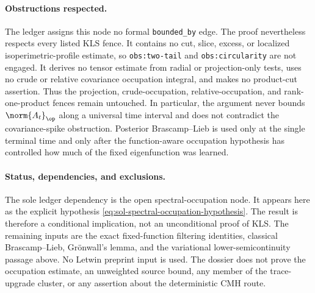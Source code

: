 \documentclass[../main.tex]{subfiles}
\begin{document}
\paragraph{Obstructions respected.}
The ledger assigns this node no formal \texttt{bounded\_by} edge.
The proof nevertheless respects every listed KLS fence.  It contains no cut, slice, excess, or
localized isoperimetric-profile estimate, so \texttt{obs:two-tail} and
\texttt{obs:circularity} are not engaged.  It derives no tensor estimate from radial or
projection-only tests, uses no crude or relative covariance occupation integral, and makes no
product-cut assertion.  Thus the projection, crude-occupation, relative-occupation, and
rank-one-product fences remain untouched.  In
particular, the argument never bounds $\norm{A_t}_\op$ along a universal time interval and does
not contradict the covariance-spike obstruction.  Posterior Brascamp--Lieb is used only at the
single terminal time and only after the function-aware occupation hypothesis has controlled how
much of the fixed eigenfunction was learned.

\paragraph{Status, dependencies, and exclusions.}
The sole ledger dependency is the open spectral-occupation node.  It appears here as the explicit
hypothesis \eqref{eq:sol-spectral-occupation-hypothesis}.  The result is therefore a
conditional implication, not an unconditional proof of KLS.  The remaining inputs are the exact
fixed-function filtering identities, classical Brascamp--Lieb, Gr\"onwall's lemma, and the
variational lower-semicontinuity passage above.  No Letwin preprint input is used.  The dossier
does not prove the occupation estimate, an unweighted source bound, any member of the
trace-upgrade cluster, or any assertion about the deterministic CMH route.
\end{document}
